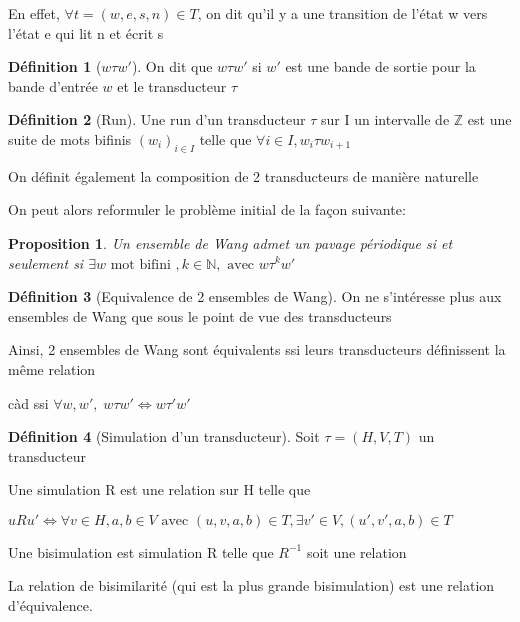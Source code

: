 \documentclass{scrartcl}
\newcommand{\N}{\mathbb N}
\newcommand{\Z}{\mathbb Z}
\newtheorem{proposition}{Proposition}
\theoremstyle{definition}
\newtheorem{definition}{Définition}
\theoremstyle{remark}
\begin{document}
En effet, $\forall t = (w,e,s,n) \in T$, on dit qu'il y a une transition de l'état w vers l'état e qui lit n et écrit s

\begin{definition}[$w \tau w'$]
    
On dit que $w \tau w'$ si $w'$ est une bande de sortie pour la bande d'entrée $w$ et le transducteur $\tau$


\end{definition}

\begin{definition}[Run]
    
Une run d'un transducteur $\tau$ sur I un intervalle de $\Z$ est une suite de mots bifinis ${(w_i)}_{i \in I}$
telle que $\forall i \in I, w_i \tau w_{i+1}$

\end{definition}

On définit également la composition de 2 transducteurs de manière naturelle

On peut alors reformuler le problème initial de la façon suivante:

\begin{proposition}
    
Un ensemble de Wang admet un pavage périodique si et seulement si $\exists w \text{ mot bifini }, k \in \N, \text{ avec } w \tau^k w'$

\end{proposition}

\begin{definition}[Equivalence de 2 ensembles de Wang]
    
On ne s'intéresse plus aux ensembles de Wang que sous le point de vue des transducteurs

Ainsi, 2 ensembles de Wang sont équivalents ssi leurs transducteurs définissent la même relation

càd ssi $\forall w,w', \; w \tau w' \iff w \tau' w'$


\end{definition}

\begin{definition}[Simulation d'un transducteur]

Soit $\tau = (H,V,T)$ un transducteur

Une simulation R est une relation sur H telle que 
    
$uRu' \iff \forall v \in H, a,b \in V \text{ avec } (u,v,a,b) \in T, \exists v' \in V, (u',v',a,b) \in T$

Une bisimulation est simulation R telle que $R^{-1}$ soit une relation

La relation de bisimilarité (qui est la plus grande bisimulation) est une relation d'équivalence.

\end{definition}
\end{document}
